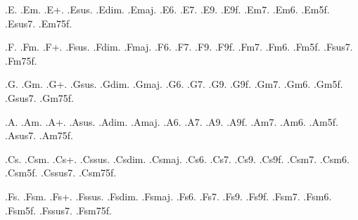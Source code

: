 %
%
.E.{}
.Em.{}
.E+.{}
.Esus.{}
.Edim.{}
.Emaj.{}
.E6.{}
.E7.{}
.E9.{}
.E9f.{}
.Em7.{}
.Em6.{}
.Em5f.{}
.Esus7.{}
.Em75f.{}

%
%
.F.{}
.Fm.{}
.F+.{}
.Fsus.{}
.Fdim.{}
.Fmaj.{}
.F6.{}
.F7.{}
.F9.{}
.F9f.{}
.Fm7.{}
.Fm6.{}
.Fm5f.{}
.Fsus7.{}
.Fm75f.{}

%
%
.G.{}
.Gm.{}
.G+.{}
.Gsus.{}
.Gdim.{}
.Gmaj.{}
.G6.{}
.G7.{}
.G9.{}
.G9f.{}
.Gm7.{}
.Gm6.{}
.Gm5f.{}
.Gsus7.{}
.Gm75f.{}

%
%
.A.{}
.Am.{}
.A+.{}
.Asus.{}
.Adim.{}
.Amaj.{}
.A6.{}
.A7.{}
.A9.{}
.A9f.{}
.Am7.{}
.Am6.{}
.Am5f.{}
.Asus7.{}
.Am75f.{}

%
%
.Cs.{}
.Csm.{}
.Cs+.{}
.Cssus.{}
.Csdim.{}
.Csmaj.{}
.Cs6.{}
.Cs7.{}
.Cs9.{}
.Cs9f.{}
.Csm7.{}
.Csm6.{}
.Csm5f.{}
.Cssus7.{}
.Csm75f.{}

%
%
.Fs.{}
.Fsm.{}
.Fs+.{}
.Fssus.{}
.Fsdim.{}
.Fsmaj.{}
.Fs6.{}
.Fs7.{}
.Fs9.{}
.Fs9f.{}
.Fsm7.{}
.Fsm6.{}
.Fsm5f.{}
.Fssus7.{}
.Fsm75f.{}

